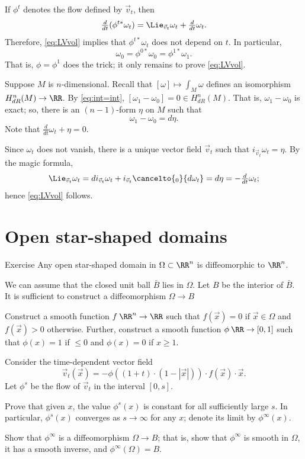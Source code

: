 If $\phi^t$ denotes the flow defined by $\vec v_t$, then
\[\tfrac d{dt}(\phi^{t*}\omega_t)=\Lie_{\vec v_t}\omega_t+\tfrac d{dt}\omega_t.\]
Therefore, \ref{eq:LVvol} implies that $\phi^{t*}\omega_t$ does not depend on $t$.
In particular,
\[\omega_0=\phi^{0*}\omega_0=\phi^{1*}\omega_1.\]
That is, $\phi=\phi^1$ does the trick; it only remains to prove \ref{eq:LVvol}.

Suppose $M$ is $n$-dimensional.
Recall that $[\omega]\mapsto\int_M\omega$ defines an isomorphism $H^n_{dR}(M)\to\RR$.
By \ref{eq:int=int}, $[\omega_1-\omega_0]=0\in H^n_{dR}(M)$.
That is, $\omega_1-\omega_0$ is exact; so, there is an $(n-1)$-form $\eta$ on $M$ such that
\[\omega_1-\omega_0=d\eta.\]
Note that $\tfrac{d}{d t} \omega_t+\eta=0$.

Since $\omega_t$ does not vanish, there is a unique vector field $\vec{v}_t$ such that
$i_{\vec v_t}\omega_t=\eta$.
By the magic formula,
\[\Lie_{\vec v_t}\omega_t=di_{\vec v_t}\omega_t+i_{\vec v_t}\cancelto{{}_0}{d\omega_t}=d\eta=-\tfrac{d}{d t} \omega_t;\]
hence \ref{eq:LVvol} follows.
\qeds

\section{Open star-shaped domains}

\begin{thm}{Exercise}
Any open star-shaped domain in $\Omega\subset\RR^n$ is diffeomorphic to $\RR^n$.
\end{thm}

We can assume that the closed unit ball $\bar B$ lies in $\Omega$.
Let $B$ be the interior of $\bar B$.
It is sufficient to construct a diffeomorphism $\Omega\to B$

Construct a smooth function $f\:\RR^n\to \RR$ such that
$f(\vec x)=0$ if $\vec x\in \Omega$ and $f(\vec x)>0$ otherwise.
Further, construct a smooth function $\phi\:\RR\to [0,1]$ such that $\phi(x)=1$ if $\le 0$ and $\phi(x)=0$ if $x\ge 1$.

Consider the time-dependent vector field
\[\vec v_t(\vec x)=-\phi((1+t)\cdot(1-|\vec x|))\cdot f(\vec x)\cdot \vec x.\]
Let $\phi^s$ be the flow of $\vec v_t$ in the interval $[0,s]$.

Prove that given $x$, the value $\phi^s(x)$ is constant for all sufficiently large $s$.
In particular, $\phi^s(x)$ converges as $s\to\infty$ for any $x$;
denote its limit by $\phi^\infty(x)$.

Show that $\phi^\infty$ is a diffeomorphism $\Omega\to B$;
that is, show that $\phi^\infty$ is smooth in $\Omega$, it has a smooth inverse, and $\phi^\infty(\Omega)=B$.
\qeds

